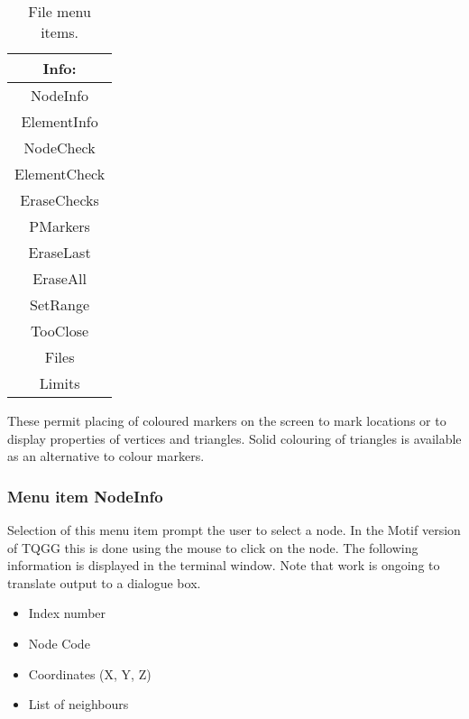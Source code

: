 \documentclass{article}
\begin{document}
\begin{table}[htb!]
 \caption{File menu items.}
  \begin{center}
   \begin{tabular}{|c|}
    \hline
Info:\\     \hline
NodeInfo \\ ElementInfo \\     \hline
NodeCheck \\ ElementCheck \\ EraseChecks \\     \hline
PMarkers \\ EraseLast \\ EraseAll \\     \hline
SetRange \\ TooClose \\     \hline
Files \\ Limits \\
    \hline
   \end{tabular}
   \label{tab:INFO}
  \end{center}
\end{table}

These permit placing of coloured markers on the screen to mark locations or to display properties of vertices and triangles. Solid colouring of triangles is available as an alternative to colour markers.


\subsubsection{Menu item NodeInfo}
Selection of this menu item prompt the user to select a node.  In the Motif version of TQGG this is done using the mouse to click on the node.  The following information is displayed in the terminal window.  Note that work is ongoing to translate output to a dialogue box.

\begin{itemize}
\item Index number
\item Node Code
\item Coordinates (X, Y, Z)
\item List of neighbours 
\end{itemize}
\end{document}
